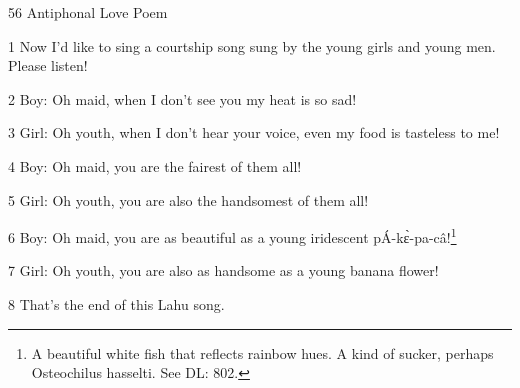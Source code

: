 
56 Antiphonal Love Poem

1 Now I'd like to sing a courtship song sung by the young girls and young men.
Please listen!

2 Boy: Oh maid, when I don't see you my heat is so sad!

3 Girl: Oh youth, when I don't hear your voice, even my food is tasteless to me!

4 Boy: Oh maid, you are the fairest of them all!

5 Girl: Oh youth, you are also the handsomest of them all!

6 Boy: Oh maid, you are as beautiful as a young iridescent pÁ-kɛ̀-pa-câ!\footnote{A beautiful white fish that reflects rainbow hues. A kind of sucker, perhaps Osteochilus hasselti. See DL: 802.}

7 Girl: Oh youth, you are also as handsome as a young banana flower!

8 That's the end of this Lahu song.

